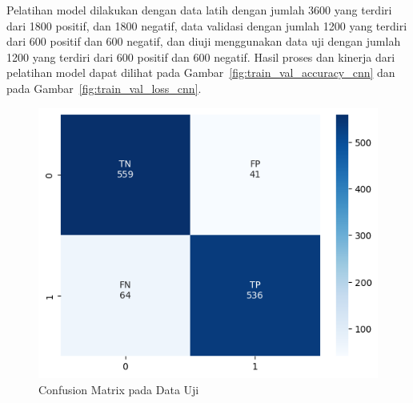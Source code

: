 Pelatihan model dilakukan dengan data latih dengan jumlah 3600 yang terdiri dari 1800 positif, dan 1800
negatif, data validasi dengan jumlah 1200 yang terdiri dari 600 positif dan 600 negatif, dan diuji menggunakan
data uji dengan jumlah 1200 yang terdiri dari 600 positif dan 600 negatif. Hasil proses dan kinerja dari
pelatihan model dapat dilihat pada Gambar~\ref{fig:train_val_accuracy_cnn} dan pada Gambar~\ref{fig:train_val_loss_cnn}.

\begin{figure}[H]
  \centering
  \includegraphics[scale=0.8]{assets/cm_heatmap.png}
  \caption{Confusion Matrix pada Data Uji}
  \label{fig:result_cm_testing}
\end{figure}

